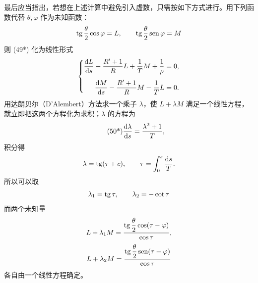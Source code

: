 最后应当指出，若想在上述计算中避免引入虚数，只需按如下方式进行。用下列函数代替 \(\theta,\varphi\) 作为未知函数：
\[
\operatorname{tg}\frac{\theta}{2}\cos\varphi=L,
\qquad
\operatorname{tg}\frac{\theta}{2}\operatorname{sen}\varphi=M
\]
则 (49*) 化为线性形式
\[
\left\{
\begin{aligned}
\frac{\mathrm{d} L}{\mathrm{d} s}-\frac{R'+1}{R}L+\frac{1}{T}M+\frac{1}{\rho}&=0,\\[0.4em]
\frac{\mathrm{d} M}{\mathrm{d} s}-\frac{R'+1}{R}M-\frac{1}{T}L&=0.
\end{aligned}\right.
\]
用达朗贝尔（D'Alembert）方法求一个乘子 \(\lambda\)，使 \(L+\lambda M\) 满足一个线性方程，就立即把这两个方程化为求积；\(\lambda\) 的方程为
\begin{equation}\tag{50*}
\frac{\mathrm{d}\lambda}{\mathrm{d} s}=\frac{\lambda^2+1}{T},
\end{equation}
积分得
\[
\lambda=\operatorname{tg}(\tau+c),
\qquad
\tau=\int_0^s\frac{\mathrm{d} s}{T}.
\]
所以可以取
\[
\lambda_1=\operatorname{tg}\tau,
\qquad
\lambda_2=-\cot\tau
\]
而两个未知量
\[
L+\lambda_1M=\frac{\operatorname{tg}\dfrac{\theta}{2}\cos(\tau-\varphi)}{\cos\tau},
\]
\[
L+\lambda_2M=\frac{\operatorname{tg}\dfrac{\theta}{2}\operatorname{sen}(\tau-\varphi)}{\cos\tau}
\]
各自由一个线性方程确定。
